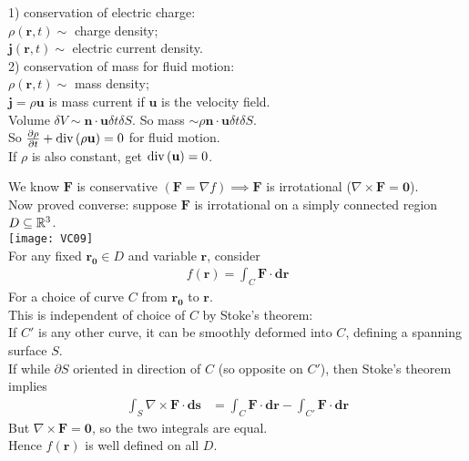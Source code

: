 \documentclass[a4paper]{article}
\begin{document}
\begin{eg}
1) conservation of electric charge:\\
$\rho\left(\mathbf{r},t\right) \sim$ charge density;\\
$\mathbf{j}\left(\mathbf{r},t\right) \sim$ electric current density.\\

2) conservation of mass for fluid motion:\\
$\rho\left(\mathbf{r},t\right) \sim$ mass density;\\
$\mathbf{j}=\rho\mathbf{u}$ is mass current if $\mathbf{u}$ is the velocity field.\\
Volume $\delta V \sim \mathbf{n}\cdot\mathbf{u}\delta t\delta S$. So mass $\sim \rho\mathbf{n}\cdot\mathbf{u}\delta t\delta S$.\\
So $\frac{\partial \rho}{\partial t}+\operatorname{div}\left(\rho\mathbf{u}\right)=0$ for fluid motion.\\
If $\rho$ is also constant, get $\operatorname{div}\left(\mathbf{u}\right)=0$.\\
\end{eg}

We know $\mathbf{F}$ is conservative $\left(\mathbf{F}=\nabla f\right) \implies \mathbf{F}$ is irrotational ($\nabla \times \mathbf{F}=\mathbf{0}$).\\
Now proved converse: suppose $\mathbf{F}$ is irrotational on a simply connected region $D\subseteq \mathbb{R}^3$.\\
\texttt{[image: VC09]}\\
For any fixed $\mathbf{r_0} \in D$ and variable $\mathbf{r}$, consider\\
\begin{equation*}
\begin{aligned}
f\left(\mathbf{r}\right) = \int_C \mathbf{F}\cdot \mathbf{dr}
\end{aligned}
\end{equation*}
For a choice of curve $C$ from $\mathbf{r_0}$ to $\mathbf{r}$.\\
This is independent of choice of $C$ by Stoke's theorem:\\
If $C'$ is any other curve, it can be smoothly deformed into $C$, defining a spanning surface $S$.\\
If while $\partial S$ oriented in direction of $C$ (so opposite on $C'$), then Stoke's theorem implies
\begin{equation*}
\begin{aligned}
\int_S \nabla\times\mathbf{F}\cdot\mathbf{ds} &= \int_C \mathbf{F}\cdot\mathbf{dr} - \int_{C'} \mathbf{F}\cdot\mathbf{dr}
\end{aligned}
\end{equation*}
But $\nabla \times \mathbf{F}=\mathbf{0}$, so the two integrals are equal.\\
Hence $f\left(\mathbf{r}\right)$ is well defined on all $D$.\\
\end{document}
